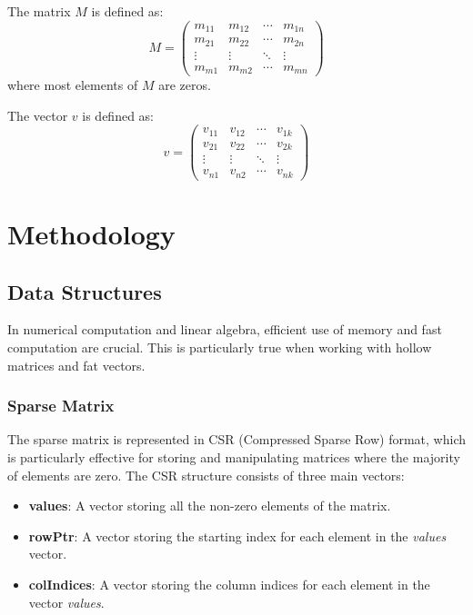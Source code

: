 \documentclass[12pt,oneside]{book} %
\begin{document}
The matrix $M$ is defined as:
\begin{equation}
    M = \begin{pmatrix}
        m_{11} & m_{12} & \cdots & m_{1n} \\
        m_{21} & m_{22} & \cdots & m_{2n} \\
        \vdots & \vdots & \ddots & \vdots \\
        m_{m1} & m_{m2} & \cdots & m_{mn}
    \end{pmatrix}
\end{equation}\label{eq:sparse-matrix}
where most elements of $M$ are zeros.

The vector $v$ is defined as:
\begin{equation}
    v = \begin{pmatrix}
        v_{11} & v_{12} & \cdots & v_{1k} \\
        v_{21} & v_{22} & \cdots & v_{2k} \\
        \vdots & \vdots & \ddots & \vdots \\
        v_{n1} & v_{n2} & \cdots & v_{nk}
    \end{pmatrix}\label{eq:dense-vector}
\end{equation}

\chapter{Methodology}
\section{Data Structures}
In numerical computation and linear algebra, efficient use of memory and fast
computation are crucial. This is particularly true when working with hollow
matrices and fat vectors.

\subsection{Sparse Matrix}
The sparse matrix is represented in CSR (Compressed Sparse Row) format, which
is particularly effective for storing and manipulating matrices where the
majority of elements are zero. The CSR structure consists of three main
vectors:
\begin{itemize}
    \item \textbf{values}: A vector storing all the non-zero elements of the matrix.
    \item \textbf{rowPtr}: A vector storing the starting index for each element in the
          \textit{values} vector.
    \item \textbf{colIndices}: A vector storing the column indices for each element in the vector \textit{values}.
          \
\end{itemize}
\end{document}
